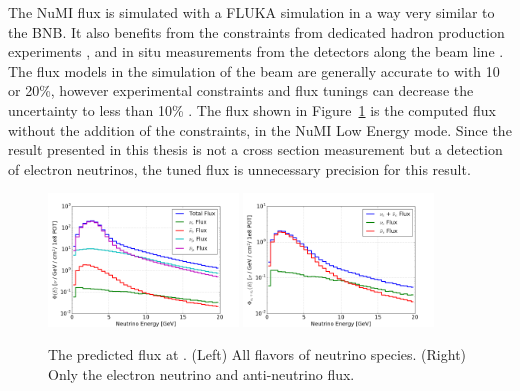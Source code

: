 The NuMI flux is simulated with a FLUKA simulation in a way very similar to the BNB.  It also benefits from the constraints from dedicated hadron production experiments \cite{Nigmanov:2009zz, Alt:2006fr}, and in situ measurements from the detectors along the beam line \cite{Aliaga:2016oaz}.  The flux models in the simulation of the beam are generally accurate to with 10 or 20\%, however experimental constraints and flux tunings can decrease the uncertainty to less than 10\% \cite{Aliaga:2016oaz}.  The flux shown in Figure~\ref{fig:argoneut_flux} is the computed \argoneut flux without the addition of the constraints, in the NuMI Low Energy mode.  Since the result presented in this thesis is not a cross section measurement but a detection of electron neutrinos, the tuned  flux is unnecessary precision for this result.

\begin{figure}[htbp]
  \centering
  \includegraphics[width=0.45\textwidth]{beams_figures/argoneutFlux.png}
  \includegraphics[width=0.45\textwidth]{beams_figures/argoneutFlux_nue.png}
  \caption[NuMI Flux at \argoneut]{The predicted flux at \argoneut.  (Left) All flavors of neutrino species. (Right) Only the electron neutrino and anti-neutrino flux.}
  \label{fig:argoneut_flux}
\end{figure}


